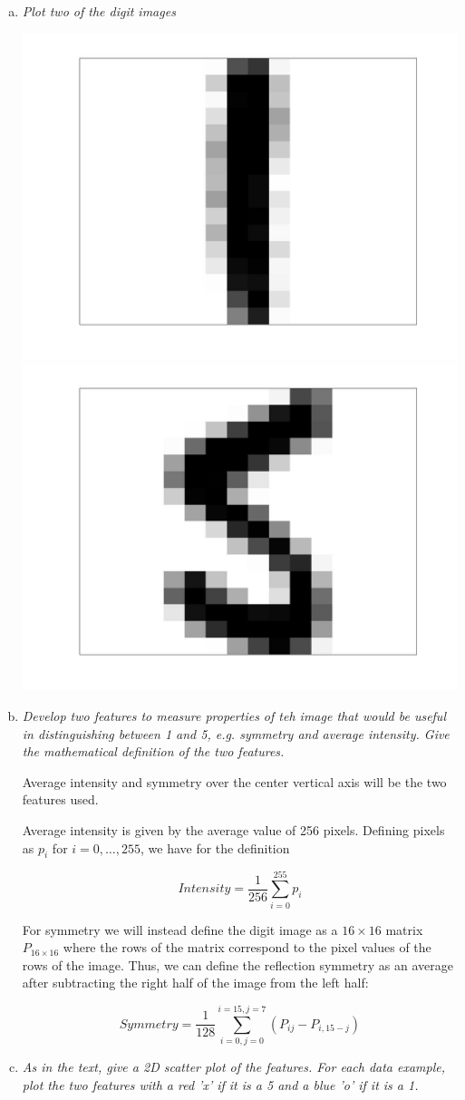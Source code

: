 \documentclass{article}
\begin{document}
\begin{enumerate}[(a)]
  \item \textit{Plot two of the digit images}

    \begin{center}
    \includegraphics[width=.4\textwidth]{im1.jpg}
    \includegraphics[width=.4\textwidth]{im5.jpg}
    \end{center}

  \item \textit{Develop two features to measure properties of teh image that would be useful in
    distinguishing between 1 and 5, e.g. symmetry and average intensity. Give the mathematical
    definition of the two features.}

    Average intensity and symmetry over the center vertical axis will be the two features used.

    Average intensity is given by the average value of 256 pixels. Defining pixels as $p_i$ for 
    $i = 0, \dots, 255$, we have for the definition

    $$Intensity = \frac{1}{256} \sum_{i=0}^{255} p_i$$

    For symmetry we will instead define the digit image as a $16\times16$ matrix $P_{16\times16}$
    where the rows of the matrix correspond to the pixel values of the rows of the image. Thus, we
    can define the reflection symmetry as an average after subtracting the right half of the image
    from the left half:

    $$Symmetry = \frac{1}{128} \sum_{i=0,j=0}^{i=15,j=7} (P_{ij} - P_{i,15-j})$$

  \item \textit{As in the text, give a 2D scatter plot of the features. For each data example,
    plot the two features with a red 'x' if it is a 5 and a blue 'o' if it is a 1.}


\end{enumerate}
\end{document}
